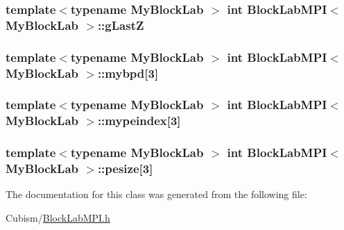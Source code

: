 \subsubsection[{g\+Last\+Z}]{\setlength{\rightskip}{0pt plus 5cm}template$<$typename My\+Block\+Lab $>$ int {\bf Block\+Lab\+M\+P\+I}$<$ My\+Block\+Lab $>$\+::g\+Last\+Z\hspace{0.3cm}{\ttfamily [protected]}}\label{class_block_lab_m_p_i_a8b9247a3ec2caad18896f597b98b7103}
\hypertarget{class_block_lab_m_p_i_a11a592341f9c28f07809f0d950512fe5}{}
\subsubsection[{mybpd}]{\setlength{\rightskip}{0pt plus 5cm}template$<$typename My\+Block\+Lab $>$ int {\bf Block\+Lab\+M\+P\+I}$<$ My\+Block\+Lab $>$\+::mybpd\mbox{[}3\mbox{]}\hspace{0.3cm}{\ttfamily [protected]}}\label{class_block_lab_m_p_i_a11a592341f9c28f07809f0d950512fe5}
\hypertarget{class_block_lab_m_p_i_a346371e08c48393a09a60188aa210828}{}
\subsubsection[{mypeindex}]{\setlength{\rightskip}{0pt plus 5cm}template$<$typename My\+Block\+Lab $>$ int {\bf Block\+Lab\+M\+P\+I}$<$ My\+Block\+Lab $>$\+::mypeindex\mbox{[}3\mbox{]}\hspace{0.3cm}{\ttfamily [protected]}}\label{class_block_lab_m_p_i_a346371e08c48393a09a60188aa210828}
\hypertarget{class_block_lab_m_p_i_a3c58102452df2ae20110af79d504693e}{}
\subsubsection[{pesize}]{\setlength{\rightskip}{0pt plus 5cm}template$<$typename My\+Block\+Lab $>$ int {\bf Block\+Lab\+M\+P\+I}$<$ My\+Block\+Lab $>$\+::pesize\mbox{[}3\mbox{]}\hspace{0.3cm}{\ttfamily [protected]}}\label{class_block_lab_m_p_i_a3c58102452df2ae20110af79d504693e}


The documentation for this class was generated from the following file\+:\begin{DoxyCompactItemize}
\item 
Cubism/\hyperlink{_block_lab_m_p_i_8h}{Block\+Lab\+M\+P\+I.\+h}\end{DoxyCompactItemize}
